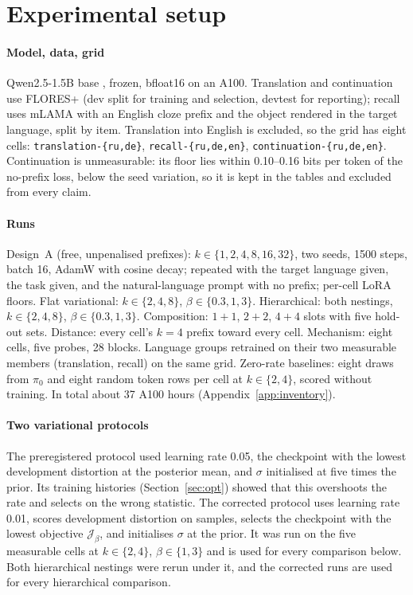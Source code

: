 \documentclass{article}
\newcommand{\cell}[1]{\texttt{#1}}
\begin{document}
\section{Experimental setup}
\paragraph{Model, data, grid}
Qwen2.5-1.5B base \citep{qwen2.5}, frozen, bfloat16 on an A100. Translation and continuation use FLORES+ (dev split for training and selection, devtest for reporting); recall uses mLAMA \citep{kassner2021multilingual} with an English cloze prefix and the object rendered in the target language, split by item. Translation into English is excluded, so the grid has eight cells: \cell{translation-\{ru,de\}}, \cell{recall-\{ru,de,en\}}, \cell{continuation-\{ru,de,en\}}. Continuation is unmeasurable: its floor lies within 0.10--0.16 bits per token of the no-prefix loss, below the seed variation, so it is kept in the tables and excluded from every claim.

\paragraph{Runs}
Design~A (free, unpenalised prefixes): $k\in\{1,2,4,8,16,32\}$, two seeds, 1500 steps, batch 16, AdamW with cosine decay; repeated with the target language given, the task given, and the natural-language prompt with no prefix; per-cell LoRA floors. Flat variational: $k\in\{2,4,8\}$, $\beta\in\{0.3,1,3\}$. Hierarchical: both nestings, $k\in\{2,4,8\}$, $\beta\in\{0.3,1,3\}$. Composition: $1{+}1$, $2{+}2$, $4{+}4$ slots with five hold-out sets. Distance: every cell's $k=4$ prefix toward every cell. Mechanism: eight cells, five probes, 28 blocks. Language groups retrained on their two measurable members (translation, recall) on the same grid. Zero-rate baselines: eight draws from $\pi_0$ and eight random token rows per cell at $k\in\{2,4\}$, scored without training. In total about 37 A100 hours (Appendix~\ref{app:inventory}).

\paragraph{Two variational protocols}
The preregistered protocol used learning rate 0.05, the checkpoint with the lowest development distortion at the posterior mean, and $\sigma$ initialised at five times the prior. Its training histories (Section~\ref{sec:opt}) showed that this overshoots the rate and selects on the wrong statistic. The corrected protocol uses learning rate 0.01, scores development distortion on samples, selects the checkpoint with the lowest objective $\mathcal J_\beta$, and initialises $\sigma$ at the prior. It was run on the five measurable cells at $k\in\{2,4\}$, $\beta\in\{1,3\}$ and is used for every comparison below. Both hierarchical nestings were rerun under it, and the corrected runs are used for every hierarchical comparison.
\end{document}
